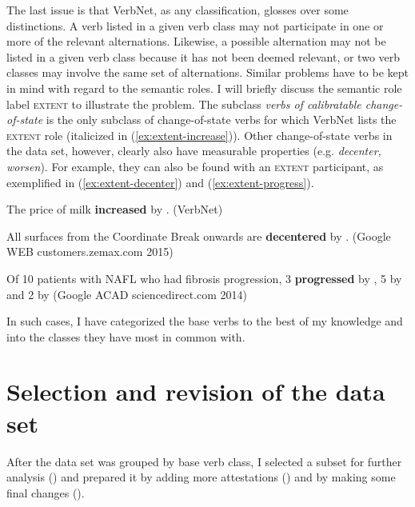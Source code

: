 The last issue is that VerbNet, as any classification, glosses over some distinctions. A verb listed in a given verb class may not participate in one or more of the relevant alternations. Likewise, a possible alternation may not be listed in a given verb class because it has not been deemed relevant, or two verb classes may involve the same set of alternations. 
Similar problems have to be kept in mind with regard to the semantic roles. I will briefly discuss the semantic role label \textsc{extent} to illustrate the problem. The subclass \textit{verbs of calibratable change-of-state} is the only subclass of change-of-state verbs for which VerbNet lists the \textsc{extent} role (italicized in (\ref{ex:extent-increase})). Other change-of-state verbs in the data set, however, clearly also have measurable properties (e.g. \textit{decenter, worsen}). For example, they can also be found with an \textsc{extent} participant, as exemplified in (\ref{ex:extent-decenter}) and (\ref{ex:extent-progress}).  

\begin{exe}
\ex \label{ex:extent}
\begin{xlist}
	\item \label{ex:extent-increase} The price of milk \textbf{increased} by . {\small (VerbNet)}
	\item \label{ex:extent-decenter} All surfaces from the Coordinate Break onwards are \textbf{decentered} by \ExHighlight{-5 mm}. {\small(Google WEB customers.zemax.com 2015)}
	\item \label{ex:extent-progress} Of 10 patients with NAFL who had fibrosis progression, 3 \textbf{progressed} by , 5 by  and 2 by  {\small(Google ACAD sciencedirect.com 2014)}
\end{xlist}
\end{exe}

\noindent In such cases, I have categorized the base verbs to the best of my knowledge and into the classes they have most in common with. 

\section{Selection and revision of the data set}\label{sec:meth-revis}\largerpage

After the data set was grouped by base verb class, I selected a subset for further analysis () and prepared it by adding more attestations () and by making some final changes ().

